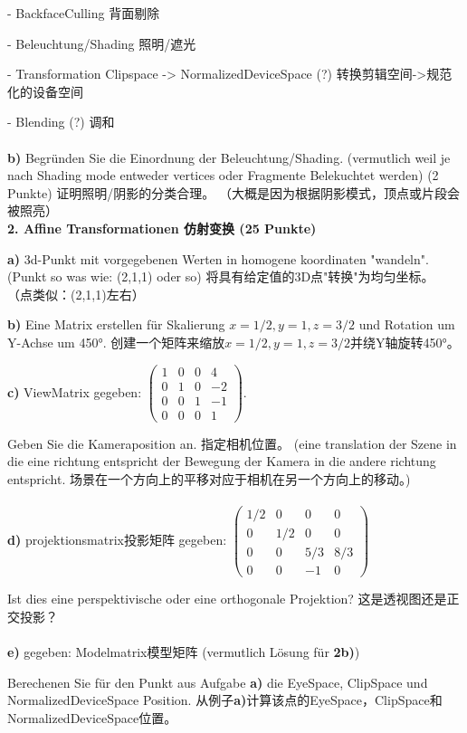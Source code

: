 \documentclass[fleqn]{article}
\begin{document}
- BackfaceCulling 背面剔除

- Beleuchtung/Shading 照明/遮光

- Transformation Clipspace -> NormalizedDeviceSpace (?) 转换剪辑空间->规范化的设备空间

- Blending (?) 调和
\\
\\
\indent\textbf{b)} Begründen Sie die Einordnung der Beleuchtung/Shading. (vermutlich weil je nach Shading mode entweder vertices oder Fragmente Belekuchtet werden) (2 Punkte) 证明照明/阴影的分类合理。 （大概是因为根据阴影模式，顶点或片段会被照亮）
\\
\noindent\textbf{2. Affine Transformationen 仿射变换 (25 Punkte)}

\indent\textbf{a)} 3d-Punkt mit vorgegebenen Werten in homogene koordinaten "wandeln". (Punkt so was wie: (2,1,1) oder so)
将具有给定值的3D点"转换"为均匀坐标。 （点类似：(2,1,1)左右）

\indent\textbf{b)} Eine Matrix erstellen für Skalierung $x = 1/2, y = 1, z = 3/2$ und Rotation um Y-Achse um 450°.
创建一个矩阵来缩放$ x = 1/2,y = 1,z = 3/2 $并绕Y轴旋转450°。

\indent\textbf{c)} ViewMatrix gegeben: $\begin{pmatrix}
    1&0&0&4\\
    0&1&0&-2\\
    0&0&1&-1\\
    0&0&0&1
\end{pmatrix}$. 

Geben Sie die Kameraposition an. 指定相机位置。
(eine translation der Szene in die eine richtung entspricht der Bewegung der Kamera in die andere richtung entspricht. 场景在一个方向上的平移对应于相机在另一个方向上的移动。) 
\\
\\
\indent\textbf{d)} projektionsmatrix投影矩阵 gegeben: $\begin{pmatrix}
    1/2&0&0&0\\
    0&1/2&0&0\\
    0&0&5/3&8/3\\
    0&0&-1&0
\end{pmatrix}$

Ist dies eine perspektivische oder eine orthogonale Projektion? 这是透视图还是正交投影？
\\
\\
\indent\textbf{e)} gegeben: Modelmatrix模型矩阵 (vermutlich Lösung für \textbf{2b)})

Berechenen Sie für den Punkt aus Aufgabe \textbf{a)} die EyeSpace, ClipSpace und NormalizedDeviceSpace Position.
从例子\textbf {a)}计算该点的EyeSpace，ClipSpace和NormalizedDeviceSpace位置。
\end{document}

